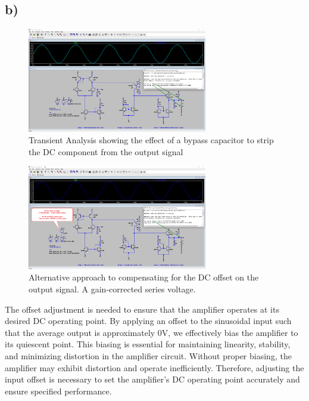 \documentclass{article}
\begin{document}
	\subsection*{b)}
	
	\begin{figure}[H]
	    \centering
	    \includegraphics[width=0.7\textwidth]{t2-b}
	    \caption{Transient Analysis showing the effect of a bypass capacitor to strip the DC component from the output signal}
	\end{figure}
	
	\begin{figure}[H]
	    \centering
	    \includegraphics[width=0.7\textwidth]{t2-b2}
	    \caption{Alternative approach to compensating for the DC offset on the output signal. A gain-corrected series voltage.}
	\end{figure}
	
	The offset adjustment is needed to ensure that the amplifier operates at its desired DC operating point. By applying an offset to the sinusoidal input such that the average output is approximately 0V, we effectively bias the amplifier to its quiescent point. This biasing is essential for maintaining linearity, stability, and minimizing distortion in the amplifier circuit. Without proper biasing, the amplifier may exhibit distortion and operate inefficiently. Therefore, adjusting the input offset is necessary to set the amplifier's DC operating point accurately and ensure specified performance.
	
\end{document}
